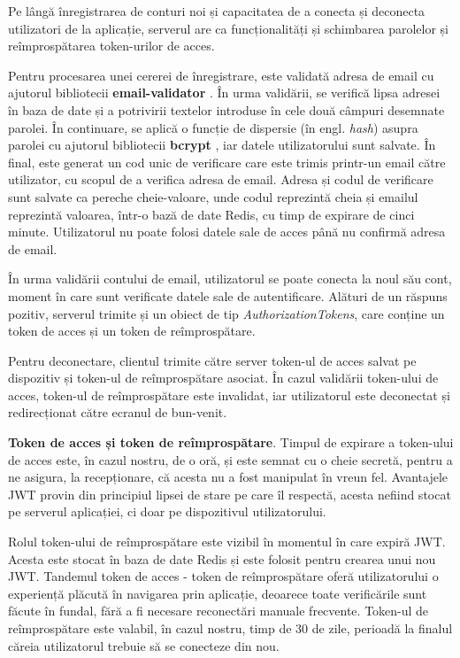 Pe lângă înregistrarea de conturi noi și capacitatea de a conecta și deconecta utilizatori de la aplicație, serverul are ca funcționalități și schimbarea parolelor și reîmprospătarea token-urilor de acces.

Pentru procesarea unei cererei de înregistrare, este validată adresa de email  cu ajutorul bibliotecii \textbf{email-validator} \cite{email_validator}. În urma validării, se verifică lipsa adresei în baza de date și a potrivirii textelor introduse în cele două câmpuri desemnate parolei. În continuare, se aplică o funcție de dispersie (în engl. \textit{hash}) asupra parolei cu ajutorul bibliotecii \textbf{bcrypt} \cite{bcrypt}, iar datele utilizatorului sunt salvate. În final, este generat un cod unic de verificare care este trimis printr-un email către utilizator, cu scopul de a verifica adresa de email. Adresa și codul de verificare sunt salvate ca pereche cheie-valoare, unde codul reprezintă cheia și emailul reprezintă valoarea, într-o bază de date Redis, cu timp de expirare de cinci minute. Utilizatorul nu poate folosi datele sale de acces până nu confirmă adresa de email.


În urma validării contului de email, utilizatorul se poate conecta la noul său cont, moment în care sunt verificate datele sale de autentificare. Alături de un răspuns pozitiv, serverul trimite și un obiect de tip \textit{AuthorizationTokens}, care conține un token de acces și un token de reîmprospătare.

Pentru deconectare, clientul trimite către server token-ul de acces salvat pe dispozitiv și token-ul de reîmprospătare asociat. În cazul validării token-ului de acces, token-ul de reîmprospătare este invalidat, iar utilizatorul este deconectat și redirecționat către ecranul de bun-venit.



\textbf{Token de acces și token de reîmprospătare}. Timpul de expirare a token-ului de acces este, în cazul nostru, de o oră, și este semnat cu o cheie secretă, pentru a ne asigura, la recepționare, că acesta nu a fost manipulat în vreun fel. Avantajele JWT provin din principiul lipsei de stare pe care îl respectă, acesta nefiind stocat pe serverul aplicației, ci doar pe dispozitivul utilizatorului.

Rolul token-ului de reîmprospătare este vizibil în momentul în care expiră JWT. Acesta este stocat în baza de date Redis și este folosit pentru crearea unui nou JWT. Tandemul token de acces - token de reîmprospătare oferă utilizatorului o experiență plăcută în navigarea prin aplicație, deoarece toate verificările sunt făcute în fundal, fără a fi necesare reconectări manuale frecvente. Token-ul de reîmprospătare este valabil, în cazul nostru, timp de 30 de zile, perioadă la finalul căreia utilizatorul trebuie să se conecteze din nou.

